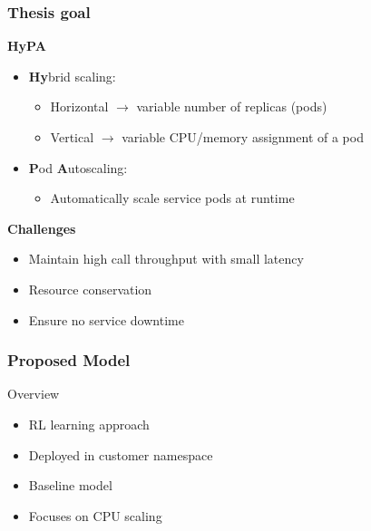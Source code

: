 \documentclass[11pt,t,usepdftitle=false,aspectratio=169]{beamer}
\begin{document}
\begin{frame}
	\frametitle{Thesis goal}
	
	\begin{block}{\textbf{HyPA}}
		\begin{itemize}
			\item \textbf{\color{uibkorange} Hy}brid scaling:
			\begin{itemize}
				\item Horizontal $\rightarrow$ variable number of replicas (pods)
				\item Vertical $\rightarrow$ variable CPU/memory assignment of a pod
			\end{itemize}
			
			\item \textbf{\color{uibkorange} P}od \textbf{\color{uibkorange} A}utoscaling:
			\begin{itemize}
				\item Automatically scale service pods at runtime
			\end{itemize}
		\end{itemize}
	\end{block}
	
	\begin{block}{\textbf{Challenges}}
		\begin{itemize}
			\item Maintain high call throughput with small latency
			\item Resource conservation
			\item Ensure no service downtime
		\end{itemize}
	\end{block}
\end{frame}

\begin{frame}
	\frametitle{Proposed Model}
	
	\begin{block}{Overview}
		\begin{itemize}
			\item RL learning approach
			\item Deployed in customer namespace
			\item Baseline model
			\item Focuses on CPU scaling
		\end{itemize}
	\end{block}
\end{frame}
\end{document}
